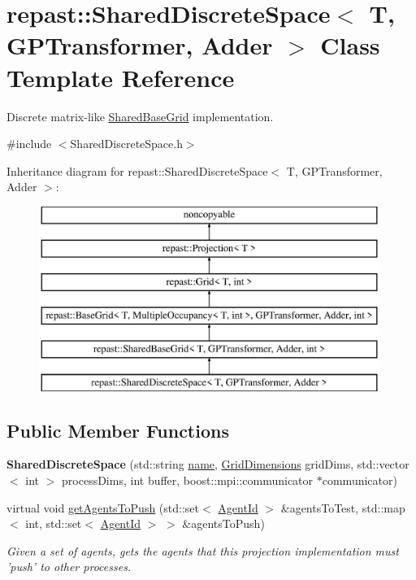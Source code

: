 \hypertarget{classrepast_1_1_shared_discrete_space}{\section{repast\-:\-:Shared\-Discrete\-Space$<$ T, G\-P\-Transformer, Adder $>$ Class Template Reference}
\label{classrepast_1_1_shared_discrete_space}
}


Discrete matrix-\/like \hyperlink{classrepast_1_1_shared_base_grid}{Shared\-Base\-Grid} implementation.  




{\ttfamily \#include $<$Shared\-Discrete\-Space.\-h$>$}

Inheritance diagram for repast\-:\-:Shared\-Discrete\-Space$<$ T, G\-P\-Transformer, Adder $>$\-:\begin{figure}[H]
\begin{center}
\leavevmode
\includegraphics[height=6.000000cm]{classrepast_1_1_shared_discrete_space}
\end{center}
\end{figure}
\subsection*{Public Member Functions}
\begin{DoxyCompactItemize}
\item 
\hypertarget{classrepast_1_1_shared_discrete_space_adc291abec4694cde796a45e2d237c968}{{\bfseries Shared\-Discrete\-Space} (std\-::string \hyperlink{classrepast_1_1_projection_ab60a0ab4f584685780307d7431b61800}{name}, \hyperlink{classrepast_1_1_grid_dimensions}{Grid\-Dimensions} grid\-Dims, std\-::vector$<$ int $>$ process\-Dims, int buffer, boost\-::mpi\-::communicator $\ast$communicator)}\label{classrepast_1_1_shared_discrete_space_adc291abec4694cde796a45e2d237c968}

\item 
virtual void \hyperlink{classrepast_1_1_shared_discrete_space_a1f690e82e6b7ea6a279db020e12b4d21}{get\-Agents\-To\-Push} (std\-::set$<$ \hyperlink{classrepast_1_1_agent_id}{Agent\-Id} $>$ \&agents\-To\-Test, std\-::map$<$ int, std\-::set$<$ \hyperlink{classrepast_1_1_agent_id}{Agent\-Id} $>$ $>$ \&agents\-To\-Push)
\begin{DoxyCompactList}\small\item\em Given a set of agents, gets the agents that this projection implementation must 'push' to other processes. \end{DoxyCompactList}\end{DoxyCompactItemize}
